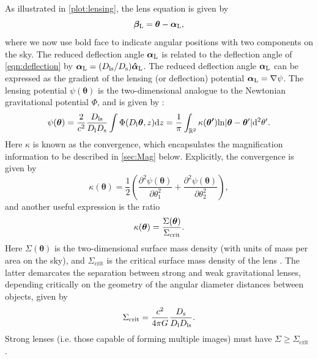 As illustrated in \autoref{plot:lensing}, the lens equation is given by 
\begin{equation}
\bm{\beta}_{\rm L} = \bm{\theta} - \bm{\alpha}_{\rm L},
\end{equation}
where we now use bold face to indicate angular positions with two components on the sky. The reduced deflection angle $\bm{\alpha}_{\rm L}$ is related to the deflection angle of \autoref{eqn:deflection} by $\bm{\alpha}_{\rm L} = (D_{\rm ls}/D_{\rm s})\bm{\hat{\alpha}}_{\rm L}$. The reduced deflection angle $\bm{\alpha}_{\rm L}$ can be expressed as the gradient of the lensing (or deflection) potential $\bm{\alpha}_{\rm L} = \nabla \psi$. The lensing potential $\psi(\bm{\theta})$ is the two-dimensional analogue to the Newtonian gravitational potential $\Phi$, and is given by \citep{NarayanBartelmann96}:
\begin{equation}
\psi(\bm{\theta}) = \frac{2}{c^2}\frac{D_{\rm ls}}{D_{\rm l} D_{\rm s}} \int \Phi(D_{\rm l} \bm{\theta},z){\rm d}z = \frac{1}{\pi} \int_{\mathbb{R}^2} \kappa(\bm{\theta'}) {\rm ln}|\bm{\theta} - \bm{\theta}'| {\rm d}^2 \theta'.
\end{equation}
Here $\kappa$ is known as the convergence, which encapsulates the magnification information to be described in \autoref{sec:Mag} below. Explicitly, the convergence is given by
\begin{equation}
\label{eqn:kappapartials}
\kappa(\bm{\theta}) =\frac{1}{2} \left( \frac{\partial^2 \psi(\bm{\theta})}{\partial\theta_1^2} + \frac{\partial^2 \psi(\bm{\theta})}{\partial\theta_2^2} \right),
\end{equation}
and another useful expression is the ratio
\begin{equation}
\label{eqn:kappa}
\kappa(\bm{\theta}) = \frac{\Sigma(\bm{\theta})}{\Sigma_{\rm crit}}.
\end{equation}
Here $\Sigma(\bm{\theta})$ is the two-dimensional surface mass density (with units of mass per area on the sky), and $\Sigma_{\mathrm{crit}}$ is the critical surface mass density of the lens \citep{Wright00}. The latter demarcates the separation between strong and weak gravitational lenses, depending critically on the geometry of the angular diameter distances between objects, given by
\begin{equation}
\label{eqn:sigcrit}
\Sigma_{\mathrm{crit}} = \frac{c^2}{4 \pi G} \frac{D_{\rm s}}{D_{\rm l} D_{\rm ls}}.
\end{equation}
Strong lenses (i.e. those capable of forming multiple images) must have $\Sigma \ge \Sigma_{\mathrm{crit}}$ \citep{Schneider06_IntroGravLensCosmology}.

